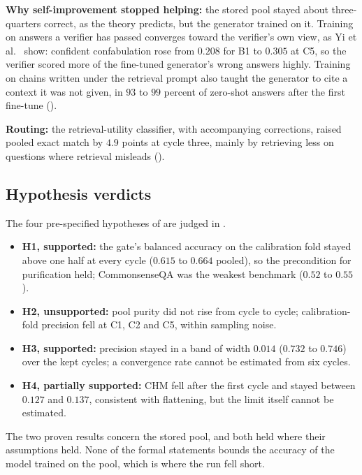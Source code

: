 \textbf{Why self-improvement stopped helping:} the stored pool stayed about three-quarters correct, as the theory predicts, but the generator trained on it. Training on answers a verifier has passed converges toward the verifier's own view, as Yi et al.~\cite{fu2025collapse} show: confident confabulation rose from $0.208$ for B1 to $0.305$ at C5, so the verifier scored more of the fine-tuned generator's wrong answers highly. Training on chains written under the retrieval prompt also taught the generator to cite a context it was not given, in $93$ to $99$ percent of zero-shot answers after the first fine-tune ().

\textbf{Routing:} the retrieval-utility classifier, with accompanying corrections, raised pooled exact match by $4.9$ points at cycle three, mainly by retrieving less on questions where retrieval misleads ().

\subsection{Hypothesis verdicts}
\label{sec:concl-hypotheses}

The four pre-specified hypotheses of  are judged in .
\begin{itemize}
    \item \textbf{H1, supported:} the gate's balanced accuracy on the calibration fold stayed above one half at every cycle ($0.615$ to $0.664$ pooled), so the precondition for purification held; CommonsenseQA was the weakest benchmark ($0.52$ to $0.55$).
    \item \textbf{H2, unsupported:} pool purity did not rise from cycle to cycle; calibration-fold precision fell at C1, C2 and C5, within sampling noise.
    \item \textbf{H3, supported:} precision stayed in a band of width $0.014$ ($0.732$ to $0.746$) over the kept cycles; a convergence rate cannot be estimated from six cycles.
    \item \textbf{H4, partially supported:} CHM fell after the first cycle and stayed between $0.127$ and $0.137$, consistent with flattening, but the limit itself cannot be estimated.
\end{itemize}
The two proven results concern the stored pool, and both held where their assumptions held. None of the formal statements bounds the accuracy of the model trained on the pool, which is where the run fell short.

